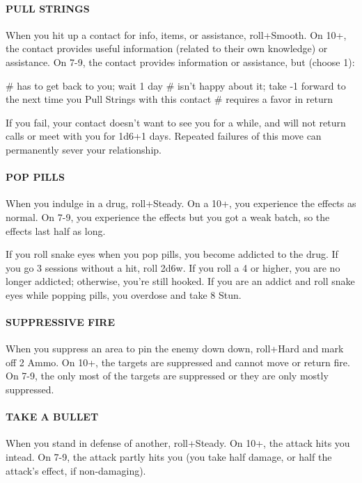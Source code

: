 \paragraph{PULL STRINGS}
When you hit up a contact for info, items, or assistance, roll+Smooth. On 10+, the contact provides useful information (related to their own knowledge) or assistance. On 7-9, the contact provides information or assistance, but (choose 1):

\begin{easylist}
# has to get back to you; wait 1 day
# isn’t happy about it; take -1 forward to the next time you Pull Strings with this contact
# requires a favor in return
\end{easylist}

If you fail, your contact doesn’t want to see you for a while, and will not return calls or meet with you for 1d6+1 days. Repeated failures of this move can permanently sever your relationship.


\paragraph{POP PILLS}
When you indulge in a drug, roll+Steady. On a 10+, you experience the effects as normal. On 7-9, you experience the effects but you got a weak batch, so the effects last half as long.

If you roll snake eyes when you pop pills, you become addicted to the drug. If you go 3 sessions without a hit, roll 2d6w. If you roll a 4 or higher, you are no longer addicted; otherwise, you’re still hooked. If you are an addict and roll snake eyes while popping pills, you overdose and take 8 Stun.


\paragraph{SUPPRESSIVE FIRE}
When you suppress an area to pin the enemy down down, roll+Hard and mark off 2 Ammo. On 10+, the targets are suppressed and cannot move or return fire. On 7-9, the only most of the targets are suppressed or they are only mostly suppressed.


\paragraph{TAKE A BULLET}
When you stand in defense of another, roll+Steady. On 10+, the attack hits you intead. On 7-9, the attack partly hits you (you take half damage, or half the attack’s effect, if non-damaging).


